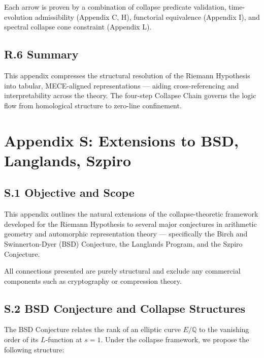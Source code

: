 \documentclass[11pt]{article}
\begin{document}
Each arrow is proven by a combination of collapse predicate validation, time-evolution admissibility (Appendix C, H), functorial equivalence (Appendix I), and spectral collapse cone constraint (Appendix L).

\subsection*{R.6 Summary}

This appendix compresses the structural resolution of the Riemann Hypothesis into tabular, MECE-aligned representations — aiding cross-referencing and interpretability across the theory. The four-step Collapse Chain governs the logic flow from homological structure to zero-line confinement.



\appendix
\section*{Appendix S: Extensions to BSD, Langlands, Szpiro}

\subsection*{S.1 Objective and Scope}

This appendix outlines the natural extensions of the collapse-theoretic framework developed for the Riemann Hypothesis to several major conjectures in arithmetic geometry and automorphic representation theory — specifically the Birch and Swinnerton-Dyer (BSD) Conjecture, the Langlands Program, and the Szpiro Conjecture.

All connections presented are purely structural and exclude any commercial components such as cryptography or compression theory.

\subsection*{S.2 BSD Conjecture and Collapse Structures}

The BSD Conjecture relates the rank of an elliptic curve \( E/\mathbb{Q} \) to the vanishing order of its \( L \)-function at \( s = 1 \). Under the collapse framework, we propose the following structure:
\end{document}
